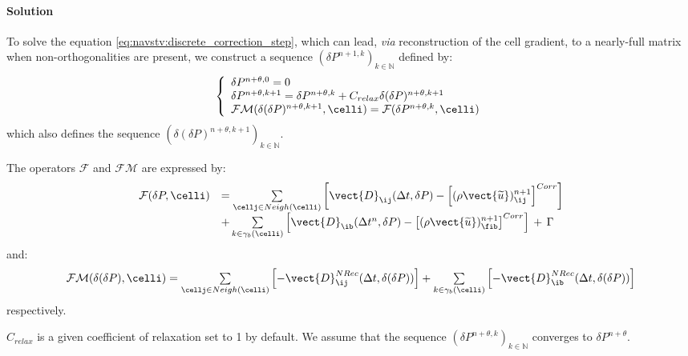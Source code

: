 \paragraph{Solution\\}
To solve the equation \eqref{eq:navstv:discrete_correction_step}, which can
lead, \emph{via}  reconstruction of the cell gradient, to a nearly-full matrix
when non-orthogonalities are present, we construct a sequence
$(\delta P^{n+1,k})_{k\in \mathbb{N}}$ defined by:
\begin{equation}
\left\{\begin{array}{l}
\delta P^{n+\theta,0} = 0\\
\delta P^{n+\theta,k+1} = \delta P^{n+\theta,k} + C_{relax} \delta (\delta P)^{n+\theta,k+1}\\
\mathcal{FM}(\delta(\delta P)^{n+\theta,k+1}, \celli) = \mathcal{F}(\delta P^{n+\theta,k}, \celli) 
\end{array}\right.
\end{equation}
which also defines the sequence $({\delta(\delta P)^{n+\theta,k+1}})_{k\in
\mathbb{N}}$.

The operators $\mathcal{F}$ and $\mathcal{FM}$ are expressed by:
\begin{equation}
\begin{array}{ll}
\mathcal{F}(\delta P, \celli) &=
 \sum\limits_{\cellj\in Neigh(\celli)}{\left[\vect{D}_{\ij}(\Delta t,\delta
P)-\left[(\rho \vect{\widetilde{u}})^{n+1}_{\ij}\right]^{Corr}\right]}\\
&+\sum\limits_{k\in {\gamma_b(\celli)}} {\left[\vect{D}_{\ib}(\Delta
t^n,\delta P)-\left[(\rho \vect{\widetilde{u}})^{n+1}_{\fib}\right]^{Corr}\right]\,+\,\Gamma}
\end{array}
\end{equation}
%
and:
\begin{equation}
\begin{array}{ll}
\mathcal{FM}(\delta (\delta P), \celli) =
 \sum\limits_{\cellj \in Neigh(\celli)}{\left[-\vect{D}^{NRec}_{\ij}(\Delta t,\delta
(\delta P))\right]} +\sum\limits_{k\in {\gamma_b(\celli)}}
\left[-\vect{D}^{NRec}_{\ib}(\Delta t,\delta(\delta P))\right]
\end{array}
\end{equation}
respectively.

$C_{relax}$ is a given coefficient of relaxation set to 1 by default.
We assume that the sequence $(\delta P^{n+\theta,k})_{k\in \mathbb{N}}$
converges
to $\delta P^{n+\theta}$.

